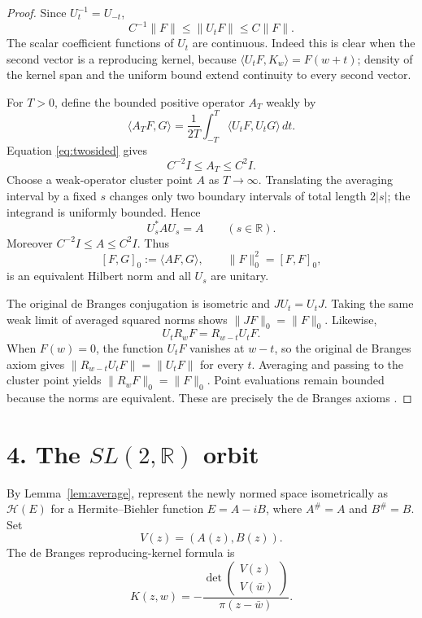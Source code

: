 \documentclass[11pt]{article}
\newcommand{\R}{\mathbb R}
\newcommand{\Hh}{\mathcal H}
\begin{document}
\begin{proof}
Since $U_t^{-1}=U_{-t}$,
\begin{equation}\label{eq:twosided}
 C^{-1}\|F\|\leq\|U_tF\|\leq C\|F\|.
\end{equation}
The scalar coefficient functions of $U_t$ are continuous.  Indeed this is
clear when the second vector is a reproducing kernel, because
$\langle U_tF,K_w\rangle=F(w+t)$; density of the kernel span and the uniform
bound extend continuity to every second vector.

For $T>0$, define the bounded positive operator $A_T$ weakly by
\[
 \langle A_TF,G\rangle=
 \frac1{2T}\int_{-T}^{T}\langle U_tF,U_tG\rangle\,dt.
\]
Equation \eqref{eq:twosided} gives
\[
 C^{-2}I\leq A_T\leq C^2I.
\]
Choose a weak-operator cluster point $A$ as $T\to\infty$.  Translating the
averaging interval by a fixed $s$ changes only two boundary intervals of
total length $2|s|$; the integrand is uniformly bounded.  Hence
\[
 U_s^*AU_s=A\qquad(s\in\R).
\]
Moreover $C^{-2}I\leq A\leq C^2I$.  Thus
\[
 [F,G]_0:=\langle AF,G\rangle,
 \qquad \|F\|_0^2=[F,F]_0,
\]
is an equivalent Hilbert norm and all $U_s$ are unitary.

The original de Branges conjugation is isometric and $JU_t=U_tJ$.  Taking
the same weak limit of averaged squared norms shows
$\|JF\|_0=\|F\|_0$.  Likewise,
\[
 U_tR_wF=R_{w-t}U_tF.
\]
When $F(w)=0$, the function $U_tF$ vanishes at $w-t$, so the original de
Branges axiom gives $\|R_{w-t}U_tF\|=\|U_tF\|$ for every $t$.  Averaging and
passing to the cluster point yields $\|R_wF\|_0=\|F\|_0$.
Point evaluations remain bounded because the norms are equivalent.  These are
precisely the de Branges axioms \cite{deBranges}.
\end{proof}

\section*{4. The $SL(2,\R)$ orbit}

By Lemma~\ref{lem:average}, represent the newly normed space isometrically as
$\Hh(E)$ for a Hermite--Biehler function $E=A-iB$, where $A^\#=A$ and
$B^\#=B$.  Set
\[
 V(z)=(A(z),B(z)).
\]
The de Branges reproducing-kernel formula is
\begin{equation}\label{eq:dbkernel}
 K(z,w)=-\frac{\det\!\begin{pmatrix}V(z)\\V(\bar w)\end{pmatrix}}
 {\pi(z-\bar w)}.
\end{equation}
\end{document}
